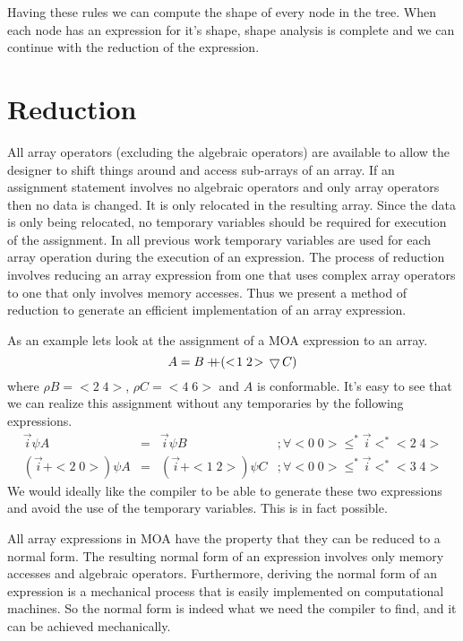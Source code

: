 Having these rules we can compute the shape of every node in the tree.  When
each node has an expression for it's shape, shape analysis is complete and we
can continue with the reduction of the expression.
 
\section*{Reduction}
 
All  array operators (excluding the algebraic operators) are 
available to allow the designer to shift things around and access sub-arrays
of an array.  If an assignment statement involves no algebraic operators and
only array operators then no data is changed. It is only relocated in the 
resulting array.  Since the data is only being relocated, no temporary 
variables should be required for execution of the assignment.  In all previous
work temporary variables are used for each array operation during the 
execution of an expression.  The process of reduction involves reducing an 
array expression from one that uses
complex array operators to one that only involves memory accesses.  Thus we
present a method of reduction to generate an efficient implementation of
an array expression.
 
As an example lets look at the assignment of a MOA expression to an array.
$$A=B+\!\!\!\!+(<\! 1\; 2\! > \,\bigtriangledown\, C)$$ where $\rho B=<\! 2\; 4\! >$, $\rho 
C=<\! 4\; 6\! >$
and $A$ is conformable.  It's easy to see that we can realize this assignment 
without any temporaries by the following expressions.
$$\begin{array}{llll}
\vec{i}\psi A & = & \vec{i}\psi B &;\forall <\! 0 \; 0\! >\leq^{*}\vec{i}
<^{*}<\! 2\; 4\! > \\
(\vec{i}+<\! 2\; 0\! >)\psi A & = & (\vec{i}+<\! 1\; 2\! >)\psi C &
;\forall <\! 0\; 0\! >\leq^{*}\vec{i}<^{*}<\! 3\; 4\! >
\end{array}$$
We would ideally like the
compiler to be able to generate these two expressions and avoid the use of
the temporary variables.  This is in fact possible.
 
All array expressions in MOA have the property that they can be reduced
to a normal form.
The resulting normal form of an expression involves only memory accesses
and algebraic operators.  Furthermore, deriving the normal form of an 
expression is a mechanical process that is easily implemented on 
computational machines.
So the normal form is indeed what we need the 
compiler to find, and it can be achieved mechanically.
 
